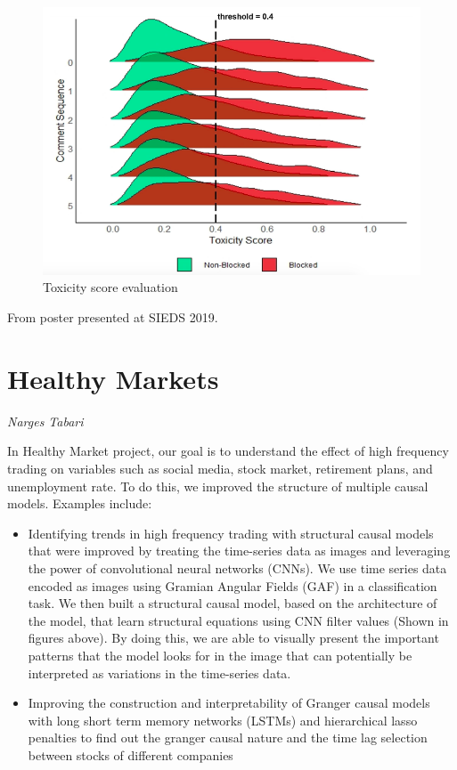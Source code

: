\begin{figure}[!hbtp]
\includegraphics[width=\textwidth]{images/wiki2}
\caption{Toxicity score evaluation}
\end{figure}

From poster presented at SIEDS 2019.

\section{Healthy Markets}
\label{sec:hmt}

\emph{Narges Tabari}
\bigskip

In Healthy Market project, our goal is to understand the effect of high frequency trading on variables such as social media, stock market, retirement plans, and unemployment rate. To do this, we improved the structure of multiple causal models. Examples include: 
\begin{itemize}
\item Identifying trends in high frequency trading with structural causal models that were improved by treating the time-series data as images and leveraging the power of convolutional neural networks (CNNs). We use time series data encoded as images using Gramian Angular Fields (GAF) in a classification task. We then built a structural causal model, based on the architecture of the model, that learn structural equations using CNN filter values (Shown in figures above). By doing this, we are able to visually present the important patterns that the model looks for in the image that can potentially be interpreted as variations in the time-series data.
\item Improving the construction and interpretability of Granger causal models with long short term memory networks (LSTMs) and hierarchical lasso penalties to find out the granger causal nature and the time lag selection between stocks of different companies 
\end{itemize}

